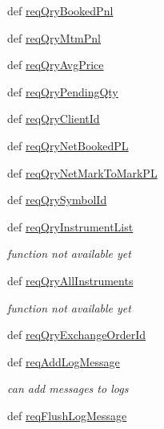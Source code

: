 \begin{DoxyCompactItemize}
\item 
def \hyperlink{classmuTradePyBase_1_1CustomStrategy_a2c6a76bc23fbab884b54abd1afbcc8b0}{req\-Qry\-Booked\-Pnl}
\item 
def \hyperlink{classmuTradePyBase_1_1CustomStrategy_a65120522f9f51a39c2ea2b8bbd885fbc}{req\-Qry\-Mtm\-Pnl}
\item 
def \hyperlink{classmuTradePyBase_1_1CustomStrategy_a36ef2df689598d77b3cfa62603772a97}{req\-Qry\-Avg\-Price}
\item 
def \hyperlink{classmuTradePyBase_1_1CustomStrategy_a09404e61148b472c6bf7d99c0f99aab0}{req\-Qry\-Pending\-Qty}
\item 
def \hyperlink{classmuTradePyBase_1_1CustomStrategy_a8f4042274a3c273711bf1ff781c07523}{req\-Qry\-Client\-Id}
\item 
def \hyperlink{classmuTradePyBase_1_1CustomStrategy_a14df454fbb91052ca189cbb08716ddb0}{req\-Qry\-Net\-Booked\-P\-L}
\item 
def \hyperlink{classmuTradePyBase_1_1CustomStrategy_a0359e30c7d98026bb840550ef97f608e}{req\-Qry\-Net\-Mark\-To\-Mark\-P\-L}
\item 
def \hyperlink{classmuTradePyBase_1_1CustomStrategy_a671886bb680bfcbe5039ca1d5445bb08}{req\-Qry\-Symbol\-Id}
\item 
def \hyperlink{classmuTradePyBase_1_1CustomStrategy_a4a72dc7dbbf2ff9046052da97d364a0f}{req\-Qry\-Instrument\-List}
\begin{DoxyCompactList}\small\item\em function not available yet \end{DoxyCompactList}\item 
def \hyperlink{classmuTradePyBase_1_1CustomStrategy_a41ff84529c342931c32890b54e6b642d}{req\-Qry\-All\-Instruments}
\begin{DoxyCompactList}\small\item\em function not available yet \end{DoxyCompactList}\item 
def \hyperlink{classmuTradePyBase_1_1CustomStrategy_a69f43e16ee7fc44e44ef11f7ec45fe52}{req\-Qry\-Exchange\-Order\-Id}
\item 
def \hyperlink{classmuTradePyBase_1_1CustomStrategy_a70d6f6d5bbcd6cd8123bc4014702f193}{req\-Add\-Log\-Message}
\begin{DoxyCompactList}\small\item\em can add messages to logs \end{DoxyCompactList}\item 
\hypertarget{classmuTradePyBase_1_1CustomStrategy_abc684cd852bbd82b4445f0e142b53196}{def \hyperlink{classmuTradePyBase_1_1CustomStrategy_abc684cd852bbd82b4445f0e142b53196}{req\-Flush\-Log\-Message}}\label{classmuTradePyBase_1_1CustomStrategy_abc684cd852bbd82b4445f0e142b53196}


\end{DoxyCompactItemize}
